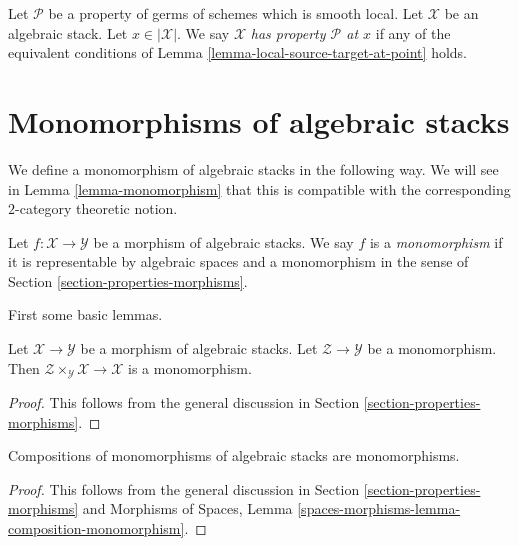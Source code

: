 \begin{definition}
\label{definition-property-at-point}
Let $\mathcal{P}$ be a property of germs of schemes which is
smooth local. Let $\mathcal{X}$ be an algebraic stack.
Let $x \in |\mathcal{X}|$.
We say $\mathcal{X}$ {\it has property $\mathcal{P}$ at $x$}
if any of the equivalent conditions of
Lemma \ref{lemma-local-source-target-at-point}
holds.
\end{definition}










\section{Monomorphisms of algebraic stacks}
\label{section-monomorphisms}

\noindent
We define a monomorphism of algebraic stacks in the following way.
We will see in
Lemma \ref{lemma-monomorphism}
that this is compatible with the corresponding $2$-category theoretic notion.

\begin{definition}
\label{definition-monomorphism}
Let $f : \mathcal{X} \to \mathcal{Y}$ be a morphism of algebraic stacks.
We say $f$ is a {\it monomorphism}
if it is representable by algebraic spaces and a monomorphism in the sense of
Section \ref{section-properties-morphisms}.
\end{definition}

\noindent
First some basic lemmas.

\begin{lemma}
\label{lemma-base-change-monomorphism}
Let $\mathcal{X} \to \mathcal{Y}$ be a morphism of algebraic stacks.
Let $\mathcal{Z} \to \mathcal{Y}$ be a monomorphism.
Then $\mathcal{Z} \times_\mathcal{Y} \mathcal{X} \to \mathcal{X}$
is a monomorphism.
\end{lemma}

\begin{proof}
This follows from the general discussion in
Section \ref{section-properties-morphisms}.
\end{proof}

\begin{lemma}
\label{lemma-composition-monomorphism}
Compositions of monomorphisms of algebraic stacks are monomorphisms.
\end{lemma}

\begin{proof}
This follows from the general discussion in
Section \ref{section-properties-morphisms}
and
Morphisms of Spaces,
Lemma \ref{spaces-morphisms-lemma-composition-monomorphism}.
\end{proof}

